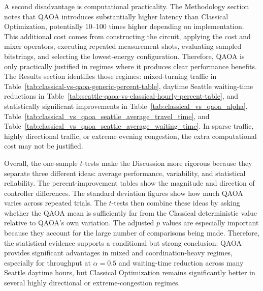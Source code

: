 \documentclass[12pt]{article}
\begin{document}
A second disadvantage is computational practicality. The Methodology section notes that QAOA introduces substantially higher latency than Classical Optimization, potentially 10--100 times higher depending on implementation. This additional cost comes from constructing the circuit, applying the cost and mixer operators, executing repeated measurement shots, evaluating sampled bitstrings, and selecting the lowest-energy configuration. Therefore, QAOA is only practically justified in regimes where it produces clear performance benefits. The Results section identifies those regimes: mixed-turning traffic in Table~\ref{tab:classical-vs-qaoa-generic-percent-table}, daytime Seattle waiting-time reductions in Table~\ref{tab:seattle-qaoa-vs-classical-hourly-percent-table}, and statistically significant improvements in Table~\ref{tab:classical_vs_qaoa_alpha}, Table~\ref{tab:classical_vs_qaoa_seattle_average_travel_time}, and Table~\ref{tab:classical_vs_qaoa_seattle_average_waiting_time}. In sparse traffic, highly directional traffic, or extreme evening congestion, the extra computational cost may not be justified.

Overall, the one-sample $t$-tests make the Discussion more rigorous because they separate three different ideas: average performance, variability, and statistical reliability. The percent-improvement tables show the magnitude and direction of controller differences. The standard deviation figures show how much QAOA varies across repeated trials. The $t$-tests then combine these ideas by asking whether the QAOA mean is sufficiently far from the Classical deterministic value relative to QAOA's own variation. The adjusted $p$ values are especially important because they account for the large number of comparisons being made. Therefore, the statistical evidence supports a conditional but strong conclusion: QAOA provides significant advantages in mixed and coordination-heavy regimes, especially for throughput at $\alpha=0.5$ and waiting-time reduction across many Seattle daytime hours, but Classical Optimization remains significantly better in several highly directional or extreme-congestion regimes.
\end{document}
